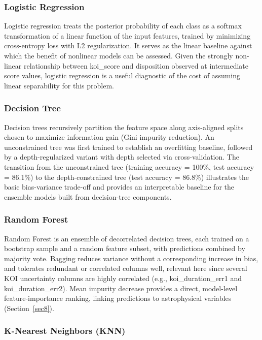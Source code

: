 \documentclass[preprint,11pt,times]{elsarticle}
\begin{document}
\subsubsection{Logistic Regression}\label{subsubsec4a1}

Logistic regression treats the posterior probability of each class as a softmax transformation of a linear function of the input features, trained by minimizing cross-entropy loss with L2 regularization. It serves as the linear baseline against which the benefit of nonlinear models can be assessed. Given the strongly non-linear relationship between koi\_score and disposition observed at intermediate score values, logistic regression is a useful diagnostic of the cost of assuming linear separability for this problem.

\subsubsection{Decision Tree}\label{subsubsec4a2}

Decision trees recursively partition the feature space along axis-aligned splits chosen to maximize information gain (Gini impurity reduction). An unconstrained tree was first trained to establish an overfitting baseline, followed by a depth-regularized variant with depth selected via cross-validation. The transition from the unconstrained tree (training accuracy = 100\%, test accuracy = 86.1\%) to the depth-constrained tree (test accuracy = 86.8\%) illustrates the basic bias-variance trade-off and provides an interpretable baseline for the ensemble models built from decision-tree components.

\subsubsection{Random Forest}\label{subsubsec4a3}

Random Forest is an ensemble of decorrelated decision trees, each trained on a bootstrap sample and a random feature subset, with predictions combined by majority vote. Bagging reduces variance without a corresponding increase in bias, and tolerates redundant or correlated columns well, relevant here since several KOI uncertainty columns are highly correlated (e.g., koi\_duration\_err1 and koi\_duration\_err2). Mean impurity decrease provides a direct, model-level feature-importance ranking, linking predictions to astrophysical variables (Section~\ref{sec8}).

\subsubsection{K-Nearest Neighbors (KNN)}\label{subsubsec4a4}
\end{document}
